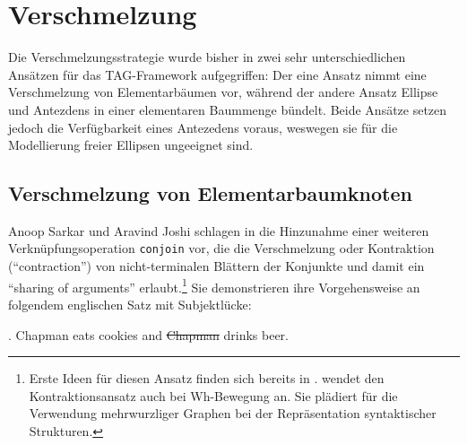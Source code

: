 \section{Verschmelzung}

Die Verschmelzungsstrategie wurde bisher in zwei sehr unterschiedlichen Ansätzen für das TAG-Framework aufgegriffen: Der eine Ansatz nimmt eine Verschmelzung von Elementarbäumen vor, während der andere Ansatz Ellipse und Antezdens in einer elementaren Baummenge bündelt. Beide Ansätze setzen jedoch die Verfügbarkeit eines Antezedens voraus, weswegen sie für die Modellierung freier Ellipsen ungeeignet sind. 

\subsection{Verschmelzung von Elementarbaumknoten}

Anoop Sarkar und Aravind Joshi schlagen in \cite{Sarkar:Joshi:96,Sarkar:Joshi:97} die Hinzunahme einer weiteren Verknüpfungsoperation {\tt conjoin} vor, die die Verschmelzung oder Kontraktion ("`contraction"') von nicht-terminalen Blättern der Konjunkte und damit ein "`sharing of arguments"' erlaubt.\footnote{Erste Ideen für diesen Ansatz finden sich bereits in \cite{Joshi:Schabes:91}. \cite{Chen-Main:06} wendet den Kontraktionsansatz auch bei Wh-Bewegung an. Sie plädiert für die Verwendung mehrwurzliger Graphen bei der Repräsentation syntaktischer Strukturen.} Sie demonstrieren ihre Vorgehensweise an folgendem englischen Satz mit Subjektlücke:

\ex. \label{ex-contraction-1} Chapman eats cookies and \sout{Chapman} drinks beer.\\
\cite[(7)]{Sarkar:Joshi:97}

